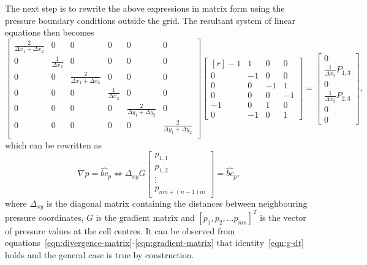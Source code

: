 \documentclass{article}
\begin{document}
The next step is to rewrite the above expressions in matrix form using the pressure boundary conditions outside the grid. The resultant system of linear equations then becomes
\begin{equation}\label{eqn:gradient-matrix}
	\begin{bmatrix}{}
		\frac{2}{\Delta x_1 + \Delta x_2}	&0	&0	&0	&0	&0	\\
		0	&\frac{1}{\Delta x_2}	&0	&0	&0	&0	\\
		0	&0	&\frac{2}{\Delta x_1 + \Delta x_2}	&0	&0	&0	\\
		0	&0	&0	&\frac{1}{\Delta x_2}	&0	&0	\\
		0	&0	&0	&0	&\frac{2}{\Delta y_1 + \Delta y_2}	&0	\\
		0	&0	&0	&0	&0	&\frac{2}{\Delta y_1 + \Delta y_2}\\
	\end{bmatrix}
	\begin{bmatrix*}[r]
	-1 & 1 & 0 & 0 \\
	0 & -1 & 0 & 0 \\
	0 & 0 & -1 & 1 \\
	0 & 0 & 0 & -1 \\
	-1 & 0 & 1 & 0 \\
	0 & -1 & 0 & 1
	\end{bmatrix*}
	=
	\begin{bmatrix}{}
		0\\
		\frac{1}{\Delta x_2}P_{1,3}\\
		0\\
		\frac{1}{\Delta x_2}P_{2,3}\\
		0\\
		0
	\end{bmatrix},
\end{equation}
which can be rewritten as
\begin{equation}
	\nabla p = \hat{bc}_p\iff
	\Delta_{xy}{G} 
	\begin{bmatrix}{}
  		p_{1,1} \\
	  	p_{1,2} \\
	  	\vdots \\
	  	p_{mn+(n-1)m}
	\end{bmatrix}
=\hat{bc}_p,
\end{equation}
where $\Delta_{xy}$ is the diagonal matrix containing the distances between neighbouring pressure coordinates, ${G}$ is the gradient matrix and $[p_1,p_2,...p_{mn}]^T$ is the vector of pressure values at the cell centres. It can be observed from equations~\eqref{eqn:divergence-matrix}-\eqref{eqn:gradient-matrix} that identity~\eqref{eqn:g-dt} holds and the general case is true by construction.
\end{document}
